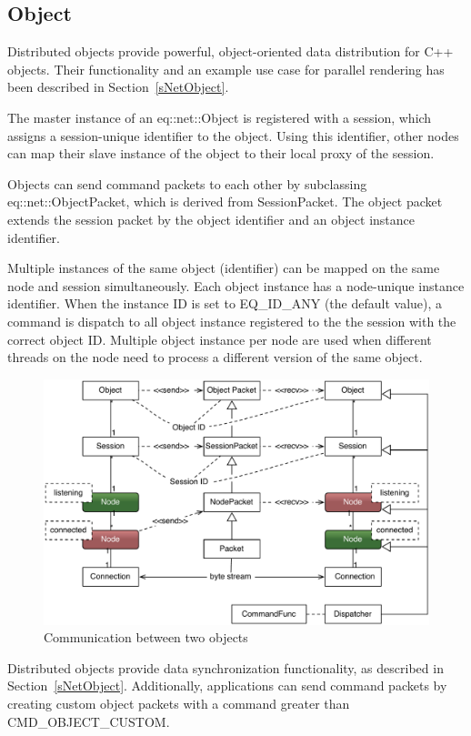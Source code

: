 \documentclass[10pt,a4]{scrartcl}
\newcommand{\sref}[1]{Section~\ref{#1}}
\begin{document}
\subsection{\label{sNetObject2}Object}

Distributed objects provide powerful, object-oriented data
distribution for C++ objects. Their functionality and an example use
case for parallel rendering has been described in \sref{sNetObject}.

The master instance of an \textsf{eq::net::Object} is registered with a
session, which assigns a session-unique identifier to the object. Using
this identifier, other nodes can map their slave instance of the object
to their local proxy of the session.

Objects can send command packets to each other by subclassing
\textsf{eq::net::Ob\-ject\-Packet}, which is derived from
\textsf{SessionPacket}. The object packet extends the session packet by
the object identifier and an object instance identifier.

Multiple instances of the same object (identifier) can be mapped on the
same node and session simultaneously. Each object instance has a
node-unique instance identifier. When the instance ID is set to
\textsf{EQ\_ID\_ANY} (the default value), a command is dispatch to all
object instance registered to the the session with the correct object
ID. Multiple object instance per node are used when different threads on
the node need to process a different version of the same object.

\begin{figure}
  \includegraphics[width=.618\textwidth]{images/netObject.pdf}
  {\caption{\label{fNetObject}Communication between two objects}}
\end{figure}
Distributed objects provide data synchronization functionality, as
described in \sref{sNetObject}. Additionally, applications can send
command packets by creating custom object packets with a command greater
than \textsf{CMD\_OBJECT\_CUSTOM}.
\end{document}
